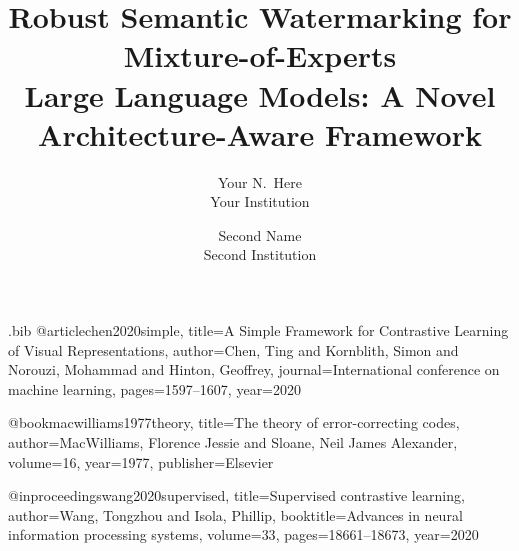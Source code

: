 \begin{filecontents}{\jobname.bib}
@article{chen2020simple,
  title={A Simple Framework for Contrastive Learning of Visual Representations},
  author={Chen, Ting and Kornblith, Simon and Norouzi, Mohammad and Hinton, Geoffrey},
  journal={International conference on machine learning},
  pages={1597--1607},
  year={2020}
}

@book{macwilliams1977theory,
  title={The theory of error-correcting codes},
  author={MacWilliams, Florence Jessie and Sloane, Neil James Alexander},
  volume={16},
  year={1977},
  publisher={Elsevier}
}

@inproceedings{wang2020supervised,
  title={Supervised contrastive learning},
  author={Wang, Tongzhou and Isola, Phillip},
  booktitle={Advances in neural information processing systems},
  volume={33},
  pages={18661--18673},
  year={2020}
}
\end{filecontents}



\date{}

\title{\Large \bf Robust Semantic Watermarking for Mixture-of-Experts\\
  Large Language Models: A Novel Architecture-Aware Framework}

\author{
{\rm Your N.\ Here}\\
Your Institution
\and
{\rm Second Name}\\
Second Institution
} %

\maketitle

